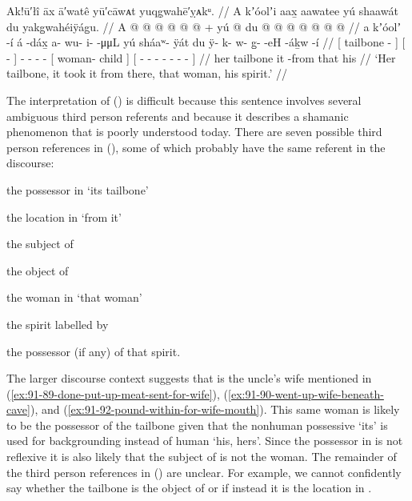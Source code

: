 \ex\label{ex:91-93-tailbone-took-from-woman-spirit}%
%
\begingl
	\glpreamble	Ak!ū′łî āx ā′watê yū′cāwᴀt yuqg̣wahē′ỵᴀkᵘ. //
	\glpreamble	A kʼóolʼi aax̱ aawatee yú shaawát du yakg̱wahéiÿág̱u. //
	\gla	{} A  @ {} {} {}  @ {} {}
		 @ {} @ {} @ {} @ {} +
		{} yú  @ {} {}
		{} du  @ {} @ {} @ {} @ {} @ {} @ {} @ {} {} //
	\glb	{} a kʼóolʼ -í {} {} á -dáx̱ {}
		a- wu- i-  -μμL
		{} yú sháaʷ- ÿát {}
		{} du ÿ- k- w- g̱-  -eH -áḵw -í {} //
	\glc	{}[  tailbone - {}] {}[  - {}]
		- - -  -
		{}[  woman- child {}]
		{}[  \xx{qual}- - - -
			 - - - {}] //
	\gld	{} her tailbone {} {} {} it -from {}
		 {} {} {} {}
		{} that  {} {}
		{} his  {} {} {} {} {} {} {} {} //
	\glft	‘Her tailbone, it took it from there, that woman, his spirit.’
		//
\endgl
\xe

The interpretation of (\lastx) is difficult because this sentence involves several ambiguous third person referents and because it describes a shamanic phenomenon that is poorly understood today.
There are seven possible third person references in (\lastx), some of which probably have the same referent in the discourse:
\begin{inlineenum}
\item	the possessor in  ‘its tailbone’
\item	the location in  ‘from it’
\item	the subject of 
\item	the object of 
\item	the woman in  ‘that woman’
\item	the spirit labelled by 
\item	the possessor (if any) of that spirit.
\end{inlineenum}
The larger discourse context suggests that  is the uncle’s wife mentioned in (\ref{ex:91-89-done-put-up-meat-sent-for-wife}), (\ref{ex:91-90-went-up-wife-beneath-cave}), and (\ref{ex:91-92-pound-within-for-wife-mouth}).
This same woman is likely to be the possessor of the tailbone given that the nonhuman possessive  ‘its’ is used for backgrounding instead of human  ‘his, hers’.
Since the possessor in  is not reflexive it is also likely that the subject of  is not the woman.
The remainder of the third person references in (\lastx) are unclear.
For example, we cannot confidently say whether the tailbone is the object of  or if instead it is the location in .

